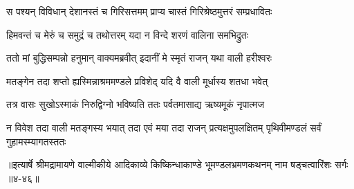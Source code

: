 \twolineshloka
{स पश्यन् विविधान् देशानस्तं च गिरिसत्तमम्}
{प्राप्य चास्तं गिरिश्रेष्ठमुत्तरं सम्प्रधावितः} %

\twolineshloka
{हिमवन्तं च मेरुं च समुद्रं च तथोत्तरम्}
{यदा न विन्दे शरणं वालिना समभिद्रुतः} %

\twolineshloka
{ततो मां बुद्धिसम्पन्नो हनुमान् वाक्यमब्रवीत्}
{इदानीं मे स्मृतं राजन् यथा वाली हरीश्वरः} %

\twolineshloka
{मतङ्गेन तदा शप्तो ह्यस्मिन्नाश्रममण्डले}
{प्रविशेद् यदि वै वाली मूर्धास्य शतधा भवेत्} %

\twolineshloka
{तत्र वासः सुखोऽस्माकं निरुद्विग्नो भविष्यति}
{ततः पर्वतमासाद्य ऋष्यमूकं नृपात्मज} %

\threelineshloka
{न विवेश तदा वाली मतङ्गस्य भयात् तदा}
{एवं मया तदा राजन् प्रत्यक्षमुपलक्षितम्}
{पृथिवीमण्डलं सर्वं गुहामस्म्यागतस्ततः} %


॥इत्यार्षे श्रीमद्रामायणे वाल्मीकीये आदिकाव्ये किष्किन्धाकाण्डे भूमण्डलभ्रमणकथनम् नाम षड्चत्वारिंशः सर्गः ॥४-४६॥
